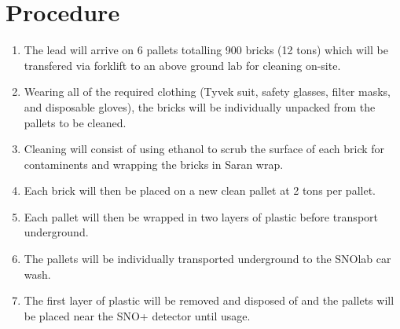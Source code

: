 \documentclass{article}
\begin{document}
\section*{Procedure}
\begin{enumerate}
  \item The lead will arrive on 6 pallets totalling 900 bricks (12 tons) which will be transfered via forklift to an above ground lab for cleaning on-site.
  \item Wearing all of the required clothing (Tyvek suit, safety glasses, filter masks, and disposable gloves), the bricks will be individually unpacked from the pallets to be cleaned.
  \item Cleaning will consist of using ethanol to scrub the surface of each brick for contaminents and wrapping the bricks in Saran wrap.
  \item Each brick will then be placed on a new clean pallet at 2 tons per pallet.
  \item Each pallet will then be wrapped in two layers of plastic before transport underground.
  \item The pallets will be individually transported underground to the SNOlab car wash.
  \item The first layer of plastic will be removed and disposed of and the pallets will be placed near the SNO+ detector until usage.
\end{enumerate}
\end{document}
